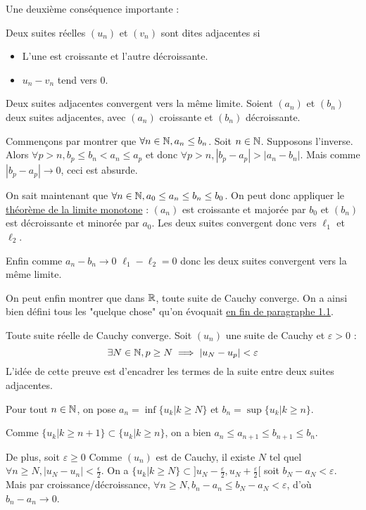 Une deuxième conséquence importante :

\begin{defini}
    Deux suites réelles $(u_n)$ et $(v_n)$ sont dites adjacentes si
    \begin{itemize}
        \item L'une est croissante et l'autre décroissante.
        \item $u_n-v_n$ tend vers 0.
    \end{itemize}
\end{defini}

\begin{theoreme}
    Deux suites adjacentes convergent vers la même limite.
    \tcblower
    Soient $(a_n)$ et $(b_n)$ deux suites adjacentes, avec $(a_n)$ croissante et $(b_n)$ décroissante.
    
    Commençons par montrer que $\forall n \in \mathbb{N}, a_n\leq b_n$. Soit $n\in \mathbb{N}$. Supposons l'inverse. Alors $\forall p > n, b_p\leq b_n<a_n\leq a_p$ et donc  $\forall p > n, |b_p-a_p|>|a_n-b_n|$. Mais comme $|b_p-a_p| \to 0$,  ceci est absurde.

    On sait maintenant que $\forall n \in \mathbb{N}, a_0 \leq a_n \leq b_n \leq b_0$. On peut donc appliquer le \hyperref[limmono]{théorème de la limite monotone} : $(a_n)$ est croissante et majorée par $b_0$ et $(b_n)$ est décroissante et minorée par $a_0$. Les deux suites convergent donc vers $\ell_1$ et $\ell_2$.

    Enfin comme $a_n-b_n \to 0$ $\ell_1-\ell_2=0$ donc les deux suites convergent vers la même limite. 
\end{theoreme}

On peut enfin montrer que dans $\mathbb{R}$, toute suite de Cauchy converge. On a ainsi bien défini tous les "quelque chose" qu'on évoquait \hyperref[motiv]{en fin de paragraphe 1.1}.

\begin{theoreme}
    Toute suite réelle de Cauchy converge.
    \tcblower
    Soit $(u_n)$ une suite de Cauchy et $\varepsilon > 0$ :
    $$\exists N \in \mathbb{N}, p \geq N \implies |u_N-u_p|<\varepsilon$$
    L'idée de cette preuve est d'encadrer les termes de la suite entre deux suites adjacentes.

    Pour tout $n\in \mathbb{N}$, on pose $a_n = \inf \{u_k|k\geq N\}$ et $b_n = \sup \{u_k|k\geq n\}$. 
    
    Comme $\{u_k|k\geq n+1\} \subset \{u_k|k\geq n\}$, on a bien $a_n \leq a_{n+1} \leq b_{n+1} \leq b_n$.

    De plus, soit $\varepsilon \geq 0$ Comme $(u_n)$ est de Cauchy, il existe $N$ tel quel $\forall n \geq N, |u_N-u_n|<\frac{\epsilon}{2}$. On a $\{u_k|k\geq N\} \subset ]u_N-\frac{\varepsilon}{2}, u_N+\frac{\varepsilon}{2}[$ soit $b_N-a_N < \varepsilon$. Mais par croissance/décroissance, $\forall n \geq N, b_n-a_n \leq b_N-a_N < \varepsilon$, d'où $b_n-a_n \to 0$. 
\end{theoreme}

